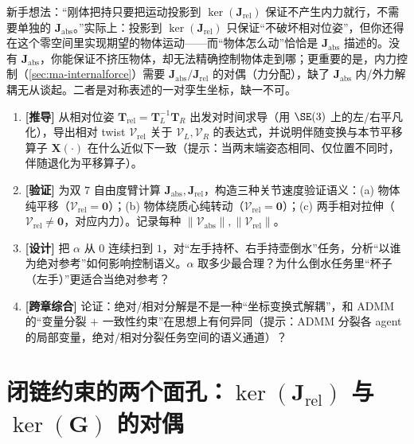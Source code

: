 \begin{pitfall}
新手想法：“刚体把持只要把运动投影到 $\ker(\mathbf{J}_{\text{rel}})$ 保证不产生内力就行，不需要单独的 $\mathbf{J}_{\text{abs}}$。”实际上：投影到 $\ker(\mathbf{J}_{\text{rel}})$ 只保证“不破坏相对位姿”，但你还得在这个零空间里实现期望的物体运动——而“物体怎么动”恰恰是 $\mathbf{J}_{\text{abs}}$ 描述的。没有 $\mathbf{J}_{\text{abs}}$，你能保证不挤压物体，却无法精确控制物体走到哪；更重要的是，内力控制（\cref{sec:ma-internalforce}）需要 $\mathbf{J}_{\text{abs}}/\mathbf{J}_{\text{rel}}$ 的对偶（力分配），缺了 $\mathbf{J}_{\text{abs}}$ 内/外力解耦无从谈起。二者是对称表述的一对孪生坐标，缺一不可。
\end{pitfall}

\begin{exercise}
\begin{enumerate}
  \item \textbf{[推导]} 从相对位姿 $\mathbf{T}_{\text{rel}}=\mathbf{T}_L^{-1}\mathbf{T}_R$ 出发对时间求导（用 $\SE(3)$ 上的左/右平凡化），导出相对 twist $\boldsymbol{\mathcal{V}}_{\text{rel}}$ 关于 $\boldsymbol{\mathcal{V}}_L,\boldsymbol{\mathcal{V}}_R$ 的表达式，并说明伴随变换与本节平移算子 $\mathbf{X}(\cdot)$ 在什么近似下一致（提示：当两末端姿态相同、仅位置不同时，伴随退化为平移算子）。
  \item \textbf{[验证]} 为双 $7$ 自由度臂计算 $\mathbf{J}_{\text{abs}},\mathbf{J}_{\text{rel}}$，构造三种关节速度验证语义：(a) 物体纯平移（$\boldsymbol{\mathcal{V}}_{\text{rel}}=\mathbf{0}$）；(b) 物体绕质心纯转动（$\boldsymbol{\mathcal{V}}_{\text{rel}}=\mathbf{0}$）；(c) 两手相对拉伸（$\boldsymbol{\mathcal{V}}_{\text{rel}}\neq\mathbf{0}$，对应内力）。记录每种 $\|\boldsymbol{\mathcal{V}}_{\text{abs}}\|,\|\boldsymbol{\mathcal{V}}_{\text{rel}}\|$。
  \item \textbf{[设计]} 把 $\alpha$ 从 $0$ 连续扫到 $1$，对“左手持杯、右手持壶倒水”任务，分析“以谁为绝对参考”如何影响控制语义。$\alpha$ 取多少最合理？为什么倒水任务里“杯子（左手）”更适合当绝对参考？
  \item \textbf{[跨章综合]} 论证：绝对/相对分解是不是一种“坐标变换式解耦”，和 ADMM 的“变量分裂 $+$ 一致性约束”在思想上有何异同（提示：ADMM 分裂各 agent 的局部变量，绝对/相对分裂任务空间的语义通道）？
\end{enumerate}
\end{exercise}

\section{闭链约束的两个面孔：\texorpdfstring{$\ker(\mathbf{J}_{\text{rel}})$}{ker(J_rel)} 与 \texorpdfstring{$\ker(\mathbf{G})$}{ker(G)} 的对偶}
\label{sec:ma-duality}

